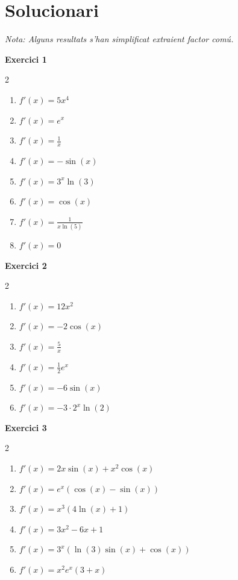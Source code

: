 \documentclass[12pt,a4paper]{article}
\begin{document}
\newpage
\section*{Solucionari}
\textit{Nota: Alguns resultats s'han simplificat extraient factor comú.}

\vspace{0.3cm}
\textbf{Exercici 1}
\begin{multicols}{2}
\begin{enumerate}[label=\alph*)]
    \item $f'(x) = 5x^4$
    \item $f'(x) = e^x$
    \item $f'(x) = \frac{1}{x}$
    \item $f'(x) = -\sin(x)$
    \item $f'(x) = 3^x \ln(3)$
    \item $f'(x) = \cos(x)$
    \item $f'(x) = \frac{1}{x \ln(5)}$
    \item $f'(x) = 0$
\end{enumerate}
\end{multicols}

\textbf{Exercici 2}
\begin{multicols}{2}
\begin{enumerate}[label=\alph*)]
    \item $f'(x) = 12x^2$
    \item $f'(x) = -2\cos(x)$
    \item $f'(x) = \frac{5}{x}$
    \item $f'(x) = \frac{1}{2} e^x$
    \item $f'(x) = -6\sin(x)$
    \item $f'(x) = -3 \cdot 2^x \ln(2)$
\end{enumerate}
\end{multicols}

\textbf{Exercici 3}
\begin{multicols}{2}
\begin{enumerate}[label=\alph*)]
    \item $f'(x) = 2x\sin(x) + x^2\cos(x)$
    \item $f'(x) = e^x(\cos(x) - \sin(x))$
    \item $f'(x) = x^3(4\ln(x) + 1)$
    \item $f'(x) = 3x^2 - 6x + 1$
    \item $f'(x) = 3^x(\ln(3)\sin(x) + \cos(x))$
    \item $f'(x) = x^2 e^x(3 + x)$
\end{enumerate}
\end{multicols}
\end{document}
